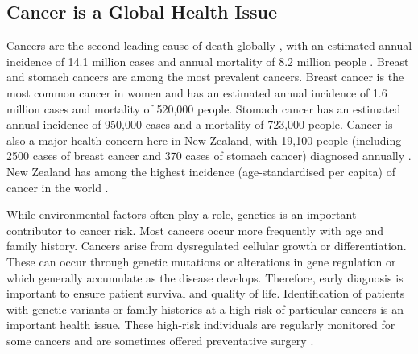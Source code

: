 \subsection{Cancer is a Global Health Issue}
Cancers are the second leading cause of death globally \citep{WorldHealthOrg2017}, with an estimated annual incidence of 14.1 million cases and annual mortality of 8.2 million people \citep{Ferlay2015}. Breast and stomach \glspl{cancer} are among the most prevalent \glspl{cancer}. Breast cancer is the most common \gls{cancer} in women and has an estimated annual incidence of 1.6 million cases and mortality of 520,000 people. Stomach cancer has an estimated annual incidence of 950,000 cases and a mortality of 723,000 people. Cancer is also a major health concern here in New Zealand, with 19,100 people (including 2500 cases of breast cancer and 370 cases of stomach cancer) diagnosed annually \citep{CIX2013}. New Zealand has among the highest incidence (age-standardised per capita) of \gls{cancer} in the world \citep{Ferlay2015}.   

While environmental factors often play a role, genetics is an important contributor to cancer risk. Most \glspl{cancer} occur more frequently with age and family history. Cancers arise from dysregulated cellular growth or differentiation. These can occur through genetic \glspl{mutation} or alterations in gene regulation or  which generally accumulate as the disease develops.
Therefore, early diagnosis is important to ensure patient survival and quality of life.
Identification of patients with genetic variants or family histories at a high-risk of particular cancers is an important health issue.
These high-risk individuals are regularly monitored for some cancers and are sometimes offered preventative surgery \citep{Scheuer2002, Guilford2010}. 

